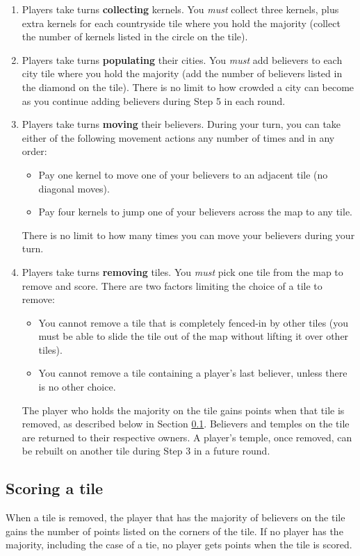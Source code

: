 \begin{enumerate}
\item Players take turns {\bf collecting} kernels.
You {\em must} collect three kernels, plus extra kernels for each countryside tile where you hold the majority (collect the number of kernels listed in the circle on the tile).

\item Players take turns {\bf populating} their cities.
You {\em must} add believers to each city tile where you hold the majority (add the number of believers listed in the diamond on the tile).
There is no limit to how crowded a city can become as you continue adding believers during Step 5 in each round.

\item Players take turns {\bf moving} their believers.
During your turn, you can take either of the following movement actions any number of times and in any order:
\begin{itemize}
\item Pay one kernel to move one of your believers to an adjacent tile (no diagonal moves).
\item Pay four kernels to jump one of your believers across the map to any tile.
\end{itemize}
There is no limit to how many times you can move your believers during your turn.

\item Players take turns {\bf removing} tiles.
You {\em must} pick one tile from the map to remove and score.
There are two factors limiting the choice of a tile to remove:
\begin{itemize}
\item You cannot remove a tile that is completely fenced-in by other tiles (you must be able to slide the tile out of the map without lifting it over other tiles).
\item You cannot remove a tile containing a player's last believer, unless there is no other choice.
\end{itemize}
The player who holds the majority on the tile gains points when that tile is removed, as described below in Section \ref{sec:scoring}.
Believers and temples on the tile are returned to their respective owners.
A player's temple, once removed, can be rebuilt on another tile during Step 3 in a future round.
\end{enumerate}




\subsection{Scoring a tile}
\label{sec:scoring}
When a tile is removed, the player that has the majority of believers on the tile gains the number of points listed on the corners of the tile.
If no player has the majority, including the case of a tie, no player gets points when the tile is scored.

